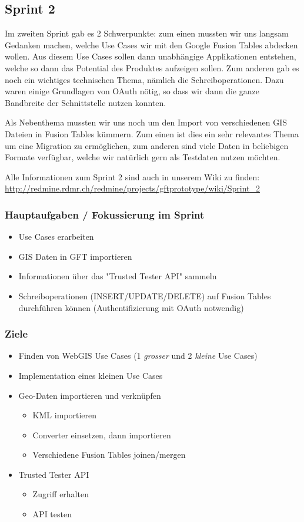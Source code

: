 \subsection{Sprint 2}

Im zweiten Sprint gab es 2 Schwerpunkte: zum einen mussten wir uns langsam Gedanken machen, welche Use Cases wir mit den Google Fusion Tables abdecken wollen. Aus diesem Use Cases sollen dann unabhängige Applikationen entstehen, welche so dann das Potential des Produktes aufzeigen sollen. Zum anderen gab es noch ein wichtiges technischen Thema, nämlich die Schreiboperationen. Dazu waren einige Grundlagen von OAuth nötig, so dass wir dann die ganze Bandbreite der Schnittstelle nutzen konnten.

Als Nebenthema mussten wir uns noch um den Import von verschiedenen GIS Dateien in Fusion Tables kümmern. Zum einen ist dies ein sehr relevantes Thema um eine Migration zu ermöglichen, zum anderen sind viele Daten in beliebigen Formate verfügbar, welche wir natürlich gern als Testdaten nutzen möchten.

Alle Informationen zum Sprint 2 sind auch in unserem Wiki zu finden:
\url{http://redmine.rdmr.ch/redmine/projects/gftprototype/wiki/Sprint_2}

\subsubsection{Hauptaufgaben / Fokussierung im Sprint}
\begin{itemize}
	\item Use Cases erarbeiten
	\item GIS Daten in GFT importieren
	\item Informationen über das "Trusted Tester API" sammeln
	\item Schreiboperationen (INSERT/UPDATE/DELETE) auf Fusion Tables durchführen können (Authentifizierung mit OAuth notwendig)
\end{itemize}

\subsubsection{Ziele}
\begin{itemize}
	\item Finden von WebGIS Use Cases (1 \emph{grosser} und 2 \emph{kleine} Use Cases)
	\item Implementation eines kleinen Use Cases
	\item Geo-Daten importieren und verknüpfen
	\begin{itemize}
		\item KML importieren
		\item Converter einsetzen, dann importieren
		\item Verschiedene Fusion Tables joinen/mergen
	\end{itemize}
	\item Trusted Tester API
	\begin{itemize}
		\item Zugriff erhalten
		\item API testen
	\end{itemize}
\end{itemize}

